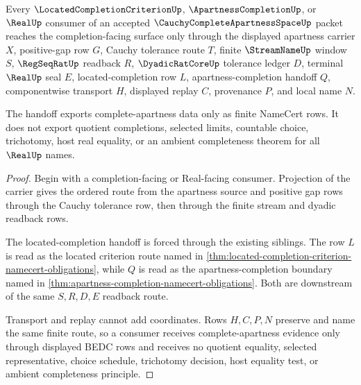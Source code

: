 \begin{theorem}
\label{thm:cauchy-complete-apartness-space-located-completion-handoff}
Every $\LocatedCompletionCriterionUp$, $\ApartnessCompletionUp$, or $\RealUp$ consumer of an accepted $\CauchyCompleteApartnessSpaceUp$ packet reaches the completion-facing surface only through the displayed apartness carrier $X$, positive-gap row $G$, Cauchy tolerance route $T$, finite $\StreamNameUp$ window $S$, $\RegSeqRatUp$ readback $R$, $\DyadicRatCoreUp$ tolerance ledger $D$, terminal $\RealUp$ seal $E$, located-completion row $L$, apartness-completion handoff $Q$, componentwise transport $H$, displayed replay $C$, provenance $P$, and local name $N$.

The handoff exports complete-apartness data only as finite NameCert rows. It does not export quotient completions, selected limits, countable choice, trichotomy, host real equality, or an ambient completeness theorem for all $\RealUp$ names.
\end{theorem}
\begin{proof}
Begin with a completion-facing or Real-facing consumer. Projection of the carrier gives the ordered route from the apartness source and positive gap rows through the Cauchy tolerance row, then through the finite stream and dyadic readback rows.

The located-completion handoff is forced through the existing siblings. The row $L$ is read as the located criterion route named in \autoref{thm:located-completion-criterion-namecert-obligations}, while $Q$ is read as the apartness-completion boundary named in \autoref{thm:apartness-completion-namecert-obligations}. Both are downstream of the same $S,R,D,E$ readback route.

Transport and replay cannot add coordinates. Rows $H,C,P,N$ preserve and name the same finite route, so a consumer receives complete-apartness evidence only through displayed BEDC rows and receives no quotient equality, selected representative, choice schedule, trichotomy decision, host equality test, or ambient completeness principle.
\end{proof}



